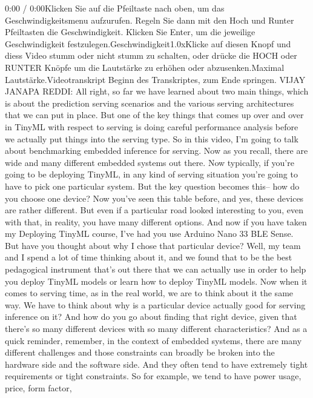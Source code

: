 {{{{{{{    0:00 / 0:00Klicken Sie auf die Pfeiltaste nach oben, um das Geschwindigkeitsmenu aufzurufen. Regeln Sie dann mit den Hoch und Runter Pfeiltasten die Geschwindigkeit. Klicken Sie Enter, um die jeweilige Geschwindigkeit festzulegen.Geschwindigkeit1.0xKlicke auf diesen Knopf und diess Video stumm oder nicht stumm zu schalten, oder drücke die HOCH oder RUNTER Knöpfe um die Lautstärke zu erhöhen oder abzusenken.Maximal Lautstärke.Videotranskript
    Beginn des Transkriptes, zum Ende springen.
    VIJAY JANAPA REDDI: All right, so far we have
    learned about two main things, which is about the prediction serving scenarios
    and the various serving architectures that we can put in place.
    But one of the key things that comes up over and over in TinyML with respect
    to serving is doing careful performance analysis before we actually
    put things into the serving type.
    So in this video, I'm going to talk about benchmarking
    embedded inference for serving.
    Now as you recall, there are wide and many different embedded systems
    out there.
    Now typically, if you're going to be deploying TinyML,
    in any kind of serving situation you're going
    to have to pick one particular system.
    But the key question becomes this-- how do you choose one device?
    Now you've seen this table before, and yes, these devices
    are rather different.
    But even if a particular road looked interesting to you, even with that,
    in reality, you have many different options.
    And now if you have taken my Deploying TinyML course,
    I've had you use Arduino Nano 33 BLE Sense.
    But have you thought about why I chose that particular device?
    Well, my team and I spend a lot of time thinking about it,
    and we found that to be the best pedagogical instrument that's
    out there that we can actually use in order to help you deploy TinyML models
    or learn how to deploy TinyML models.
    Now when it comes to serving time, as in the real world,
    we are to think about it the same way.
    We have to think about why is a particular device actually
    good for serving inference on it?
    And how do you go about finding that right device, given
    that there's so many different devices with so many different characteristics?
    And as a quick reminder, remember, in the context of embedded systems,
    there are many different challenges and those constraints can broadly
    be broken into the hardware side and the software side.
    And they often tend to have extremely tight requirements
    or tight constraints.
    So for example, we tend to have power usage, price, form factor,
}}}}}}}
